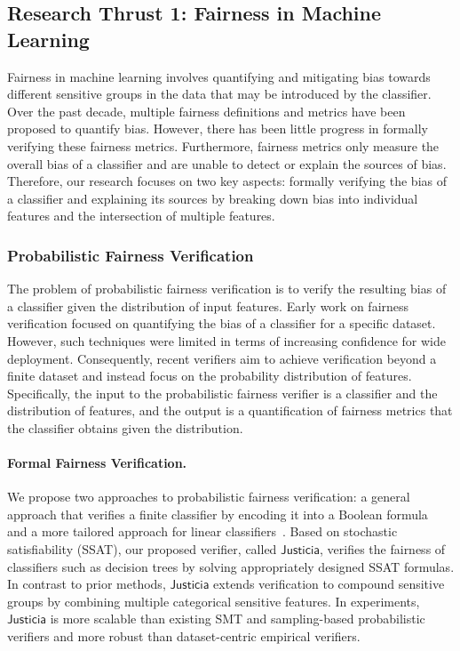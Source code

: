 \documentclass[11pt]{article}
\begin{document}
	\subsection*{Research Thrust 1: Fairness in Machine Learning}
	
	Fairness in machine learning involves quantifying and mitigating bias towards different sensitive groups in the data that may be introduced by the classifier. Over the past decade, multiple fairness definitions and metrics have been proposed to quantify bias. However, there has been little progress in formally verifying these fairness metrics. Furthermore, fairness metrics only measure the overall bias of a classifier and are unable to detect or explain the sources of bias. Therefore, our research focuses on two key aspects: formally verifying the bias of a classifier and explaining its sources by breaking down bias into individual features and the intersection of multiple features.
	
	\subsubsection*{Probabilistic Fairness Verification} The problem of probabilistic fairness verification is to verify the resulting bias of a classifier given the distribution of input features. Early work on fairness verification focused on quantifying the bias of a classifier for a specific dataset. However, such techniques were limited in terms of increasing confidence for wide deployment. Consequently, recent verifiers aim to achieve verification beyond a finite dataset and instead focus on the probability distribution of features. Specifically, the input to the probabilistic fairness verifier is a classifier and the distribution of features, and the output is a quantification of fairness metrics that the classifier obtains given the distribution.
	

	
	
	\paragraph{Formal Fairness Verification.} We propose two approaches to probabilistic fairness verification: a general approach that verifies a finite classifier by encoding it into a Boolean formula~\cite{ghosh2021justicia} and a more tailored approach for linear classifiers~\cite{ghosh2022algorithmic}. Based on stochastic satisfiability (SSAT), our proposed verifier, called $\mathsf{Justicia}$, verifies the fairness of classifiers such as decision trees by solving appropriately designed SSAT formulas. In contrast to prior methods, $\mathsf{Justicia}$ extends verification to compound sensitive groups by combining multiple categorical sensitive features. In experiments, $\mathsf{Justicia}$ is more scalable than existing SMT and sampling-based probabilistic verifiers and more robust than dataset-centric empirical verifiers.
	
\end{document}
